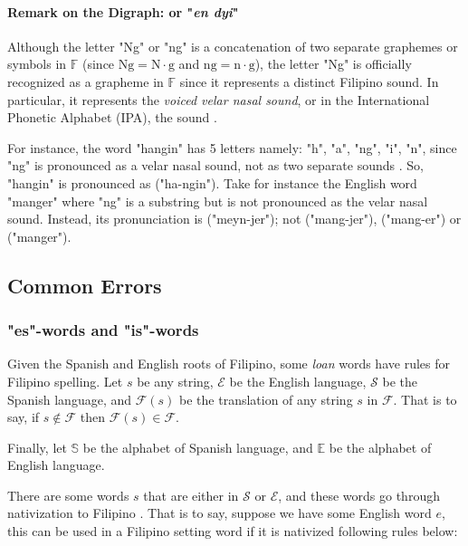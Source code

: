 \paragraph{Remark on the Digraph:  or "\textit{en dyi}"}

Although the letter "Ng" or "ng" is a concatenation of two separate graphemes or
symbols in \(\mathbb{F}\) (since \(\text{Ng} = \text{N}\cdot\text{g}\) and
\(\text{ng} = \text{n}\cdot\text{g}\)), the letter "Ng" is officially recognized
as a grapheme in \(\mathbb{F}\) since it represents a distinct Filipino sound.
In particular, it represents the \textit{voiced velar nasal sound}, or in the International
Phonetic Alphabet (IPA), the  sound \cite{Malabonga_2009}.

For instance, the word "hangin" has 5 letters namely: "h", "a", "ng", "i", "n",
since "ng" is pronounced as a velar nasal sound, not as two separate sounds
. So, "hangin" is pronounced as  ("ha-ngin").
Take for instance the English  word "manger" where "ng" is a substring
but is not pronounced as the velar nasal sound. Instead, its pronunciation is
 ("meyn-jer"); not
 ("mang-jer"),
 ("mang-er") or
 ("manger").

\subsection{Common Errors}

\subsubsection{"es"-words and "is"-words}

Given the Spanish and English roots of Filipino, some \textit{loan} words have
rules for Filipino spelling. Let \(s\) be any string, \(\mathcal{E}\) be the
English language, \(\mathcal{S}\) be the Spanish language, and \(\mathcal{F}(s)\)
be the translation of any string \(s\) in \(\mathcal{F}\). That is to say, if
\(s \notin \mathcal{F}\) then \(\mathcal{F}(s) \in \mathcal{F}\).

Finally, let \(\mathbb{S}\) be the alphabet of Spanish language, and \(\mathbb{E}\) be the
alphabet of English language.

There are some words \(s\) that are either in \(\mathcal{S}\) or \(\mathcal{E}\),
and these words go through nativization to Filipino \cite{Pitogo}. That is to say, suppose we have
some English word \(e\), this can be used in a Filipino setting word if it is
nativized following rules below:

